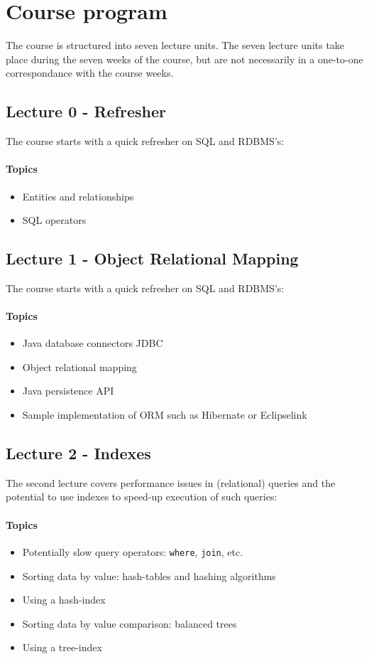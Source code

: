 \section{Course program}
	The course is structured into seven lecture units. The seven lecture units take place during the seven weeks of the course, but are not necessarily in a one-to-one correspondance with the course weeks.

	\subsection{Lecture 0 - Refresher}
		The course starts with a quick refresher on SQL and RDBMS's:

		\paragraph*{Topics}
			\begin{itemize}
				\item Entities and relationships
				\item SQL operators
			\end{itemize}
	\subsection{Lecture 1 - Object Relational Mapping}
		The course starts with a quick refresher on SQL and RDBMS's:

		\paragraph*{Topics}
			\begin{itemize}
				\item Java database connectors JDBC
				\item Object relational mapping
				\item Java persistence API
				\item Sample implementation of ORM such as Hibernate or Eclipselink
			\end{itemize}

	\subsection{Lecture 2 - Indexes}
		The second lecture covers performance issues in (relational) queries and the potential to use indexes to speed-up execution of such queries:

		\paragraph*{Topics}
			\begin{itemize}
				\item Potentially slow query operators: \texttt{where}, \texttt{join}, etc.
				\item Sorting data by value: hash-tables and hashing algorithms
				\item Using a hash-index
				\item Sorting data by value comparison: balanced trees
				\item Using a tree-index
			\end{itemize}


